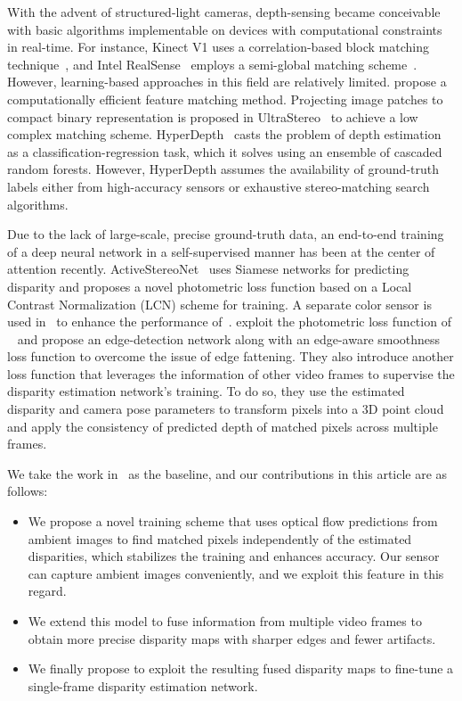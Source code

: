 With the advent of structured-light cameras, depth-sensing became conceivable with basic algorithms implementable on devices with computational constraints in real-time. For instance, Kinect V1 uses a correlation-based block matching technique~\cite{scharstein2002taxonomy}, and Intel RealSense~\cite{keselman2017intel} employs a semi-global matching scheme~\cite{hirschmuller2007stereo}. However, learning-based approaches in this field are relatively limited. \cite{ryan2017low} propose a computationally efficient feature matching method. Projecting image patches to compact binary representation is proposed in UltraStereo~\cite{fanello2017ultrastereo} to achieve a low complex matching scheme. HyperDepth~\cite{ryan2016hyperdepth} casts the problem of depth estimation as a classification-regression task, which it solves using an ensemble of cascaded random forests. However, HyperDepth assumes the availability of ground-truth labels either from high-accuracy sensors or exhaustive stereo-matching search algorithms.

Due to the lack of large-scale, precise ground-truth data, an end-to-end training of a deep neural network in a self-supervised manner has been at the center of attention recently. ActiveStereoNet~\cite{zhang2018activestereonet} uses Siamese networks for predicting disparity and proposes a novel photometric loss function based on a Local Contrast Normalization (LCN) scheme for training. A separate color sensor is used in~\cite{kleitsiotis2019color} to enhance the performance of~\cite{zhang2018activestereonet}. \cite{riegler2019connecting} exploit the photometric loss function of ~\cite{zhang2018activestereonet} and propose an edge-detection network along with an edge-aware smoothness loss function to overcome the issue of edge fattening. They also introduce another loss function that leverages the information of other video frames to supervise the disparity estimation network's training. To do so, they use the estimated disparity and camera pose parameters to transform pixels into a 3D point cloud and apply the consistency of predicted depth of matched pixels across multiple frames. 

We take the work in~\cite{riegler2019connecting} as the baseline, and our contributions in this article are as follows:
\begin{itemize}
\item We propose a novel training scheme that uses optical flow predictions from ambient images to find matched pixels independently of the estimated disparities, which stabilizes the training and enhances accuracy. Our sensor can capture ambient images conveniently, and we exploit this feature in this regard.
\item We extend this model to fuse information from multiple video frames to obtain more precise disparity maps with sharper edges and fewer artifacts.
\item We finally propose to exploit the resulting fused disparity maps to fine-tune a single-frame disparity estimation network.
\end{itemize}


